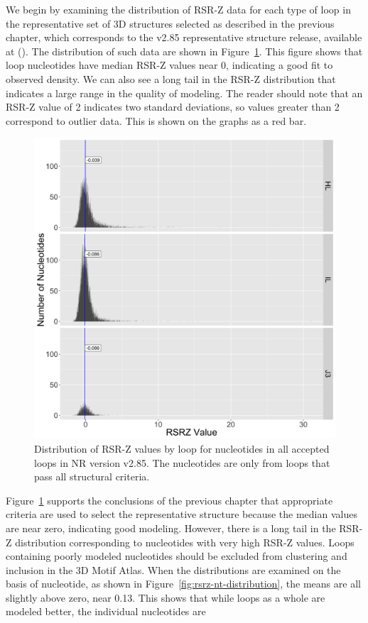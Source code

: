 We begin by examining the distribution of RSR-Z data for each type of loop in the
representative set of 3D structures selected as described in the previous
chapter, which corresponds to the v2.85 representative structure release,
available at (). The
distribution of such data are shown in Figure~\ref{fig:rsrz-distribution}. This
figure shows that loop nucleotides have median RSR-Z values near 0, indicating a
good fit to observed density. We can also see a long tail in the RSR-Z
distribution that indicates a large range in the quality of modeling. The reader
should note that an RSR-Z value of 2 indicates two standard deviations, so
values greater than 2 correspond to outlier data. This is shown on the graphs as
a red bar.

\begin{figure}
  \includegraphics[width=0.5\linewidth]{chapter-5/figs/loops/rsrz-distribution}
  \caption{Distribution of RSR-Z values by loop for nucleotides in all accepted
  loops in NR version v2.85. The nucleotides are only from loops that pass all
  structural criteria.}
  \label{fig:rsrz-distribution}
\end{figure}

Figure~\ref{fig:rsrz-distribution} supports the conclusions of the previous
chapter that appropriate criteria are used to select the representative
structure because the median values are near zero, indicating good modeling.
However, there is a long tail in the RSR-Z distribution corresponding to
nucleotides with very high RSR-Z values. Loops containing poorly modeled
nucleotides should be excluded from clustering and inclusion in the 3D Motif
Atlas. When the distributions are examined on the basis of nucleotide, as shown
in Figure~\ref{fig:rsrz-nt-distribution}, the means are all slightly above zero,
near 0.13. This shows that while loops as a whole are modeled better, the
individual nucleotides are 

